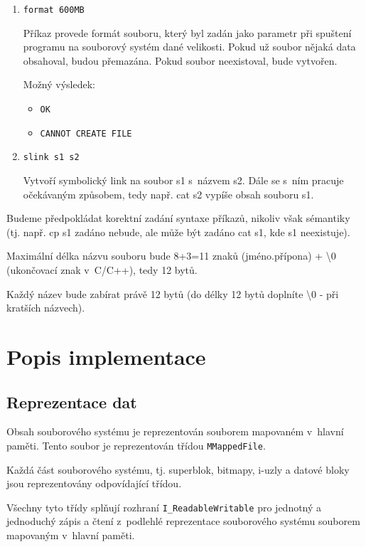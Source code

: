 \documentclass[a4paper, 12pt]{report}
\begin{document}
\begin{enumerate}
    \item \texttt{format 600MB}

    Příkaz provede formát souboru, který byl zadán jako parametr při spuštení programu na souborový systém dané velikosti. Pokud už soubor nějaká data obsahoval, budou přemazána. Pokud soubor neexistoval, bude vytvořen.

    Možný výsledek:

    \begin{itemize}
        \item[] \texttt{OK}
        \item[] \texttt{CANNOT CREATE FILE}
    \end{itemize}

    \item \texttt{slink s1 s2}

    Vytvoří symbolický link na soubor s1 s~názvem s2. Dále se s~ním pracuje očekávaným způsobem, tedy např. cat s2 vypíše obsah souboru s1.
\end{enumerate}

Budeme předpokládat korektní zadání syntaxe příkazů, nikoliv však sémantiky (tj. např. cp s1 zadáno nebude, ale může být zadáno cat s1, kde s1 neexistuje).

Maximální délka názvu souboru bude 8+3=11 znaků (jméno.přípona) + \textbackslash0 (ukončovací znak v~C/C++), tedy 12 bytů.

Každý název bude zabírat právě 12 bytů (do délky 12 bytů doplníte \textbackslash0 - při kratších názvech).

\chapter{Popis implementace}

\section{Reprezentace dat}

Obsah souborového systému je reprezentován souborem mapovaném v~hlavní paměti. Tento soubor je reprezentován třídou \texttt{MMappedFile}.

Každá část souborového systému, tj. superblok, bitmapy, i-uzly a datové bloky jsou reprezentovány odpovídající třídou.

Všechny tyto třídy splňují rozhraní \texttt{I\_ReadableWritable} pro jednotný a jednoduchý zápis a čtení z~podlehlé reprezentace souborového systému souborem mapovaným v~hlavní paměti.
\end{document}
